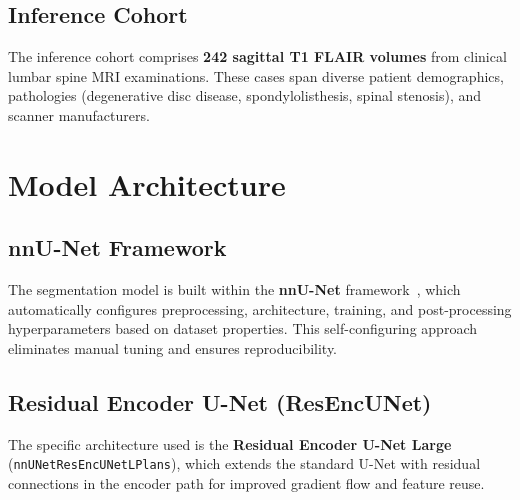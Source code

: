 \documentclass[12pt, a4paper]{article}
\begin{document}
\subsection{Inference Cohort}

The inference cohort comprises \textbf{242 sagittal T1 FLAIR volumes} from clinical lumbar spine MRI examinations. These cases span diverse patient demographics, pathologies (degenerative disc disease, spondylolisthesis, spinal stenosis), and scanner manufacturers.

\section{Model Architecture}

\subsection{nnU-Net Framework}

The segmentation model is built within the \textbf{nnU-Net} framework~\cite{isensee2021}, which automatically configures preprocessing, architecture, training, and post-processing hyperparameters based on dataset properties. This self-configuring approach eliminates manual tuning and ensures reproducibility.

\subsection{Residual Encoder U-Net (ResEncUNet)}

The specific architecture used is the \textbf{Residual Encoder U-Net Large} (\texttt{nnUNetResEncUNetLPlans}), which extends the standard U-Net with residual connections in the encoder path for improved gradient flow and feature reuse.
\end{document}
